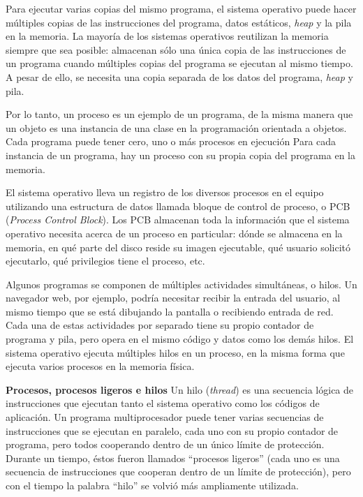 \documentclass[10pt]{book}
\begin{document}
Para ejecutar varias copias del mismo programa, el sistema operativo puede hacer múltiples copias de las instrucciones del programa, datos estáticos, \textit{heap} y la pila en la memoria. La mayoría de los sistemas operativos reutilizan la memoria siempre que sea posible: almacenan sólo una única copia de las instrucciones de un programa cuando múltiples copias del programa se ejecutan al mismo tiempo. A pesar de ello, se necesita una copia separada de los datos del programa, \textit{heap} y pila.

Por lo tanto, un proceso es un ejemplo de un programa, de la misma manera que un objeto es una instancia de una clase en la programación orientada a objetos. Cada programa puede tener cero, uno o más procesos en ejecución Para cada instancia de un programa, hay un proceso con su propia copia del programa en la memoria.

El sistema operativo lleva un registro de los diversos procesos en el equipo utilizando una estructura de datos llamada bloque de control de proceso, o PCB (\textit{Process Control Block}). Los PCB almacenan toda la información que el sistema operativo necesita acerca de un proceso en particular: dónde se almacena en la memoria, en qué parte del disco reside su imagen ejecutable, qué usuario solicitó ejecutarlo, qué privilegios tiene el proceso, etc.

Algunos programas se componen de múltiples actividades simultáneas, o hilos. Un navegador web, por ejemplo, podría necesitar recibir la entrada del usuario, al mismo tiempo que se está dibujando la pantalla o recibiendo entrada de red. Cada una de estas actividades por separado tiene su propio contador de programa y pila, pero opera en el mismo código y datos como los demás hilos. El sistema operativo ejecuta múltiples hilos en un proceso, en la misma forma que ejecuta varios procesos en la memoria física.

\textbf{Procesos, procesos ligeros e hilos}
Un hilo (\textit{thread}) es una secuencia lógica de instrucciones que ejecutan tanto el sistema operativo como los códigos de aplicación. Un programa multiprocesador puede tener varias secuencias de instrucciones que se ejecutan en paralelo, cada uno con su propio contador de programa, pero todos cooperando dentro de un único límite de protección. Durante un tiempo, éstos fueron llamados ``procesos ligeros'' (cada uno es una secuencia de instrucciones que cooperan dentro de un límite de protección), pero con el tiempo la palabra ``hilo'' se volvió más ampliamente utilizada.
\end{document}
